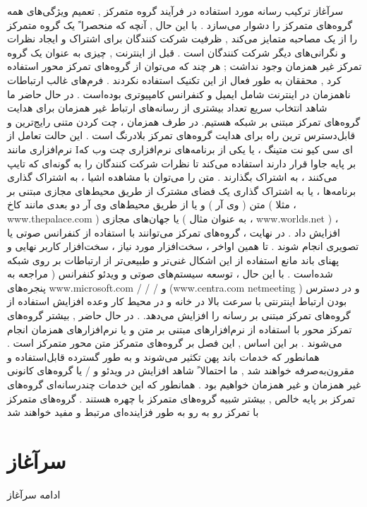 \documentclass{beamer}
\begin{document}
\begin{persian}
\begin{frame}{سرآغاز}
ترکیب رسانه مورد استفاده در فرآیند گروه متمرکز , تعمیم ویژگی‌های همه گروه‌های متمرکز را دشوار می‌سازد . با این حال , آنچه که منحصرا ً یک گروه متمرکز را از یک مصاحبه متمایز می‌کند , ظرفیت شرکت کنندگان برای اشتراک و ایجاد نظرات و نگرانی‌های دیگر شرکت کنندگان است . قبل از اینترنت , چیزی به عنوان یک گروه تمرکز غیر همزمان وجود نداشت ; هر چند که می‌توان از گروه‌های تمرکز محور استفاده کرد , محققان به طور فعال از این تکنیک استفاده نکردند . فرم‌های غالب ارتباطات ناهمزمان در اینترنت شامل ایمیل و کنفرانس کامپیوتری بوده‌است . در حال حاضر ما شاهد انتخاب سریع تعداد بیشتری از رسانه‌های ارتباط غیر همزمان برای هدایت گروه‌های تمرکز مبتنی بر شبکه هستیم. در طرف همزمان ، چت کردن متنی رایج‌ترین و قابل‌دسترس ترین راه برای هدایت گروه‌های تمرکز بلادرنگ است . این حالت تعامل از نرم‌افزاری مانند Iای سی کیو نت متینگ ، یا یکی از برنامه‌های نرم‌افزاری چت وب که بر پایه جاوا قرار دارند استفاده می‌کند تا نظرات شرکت کنندگان را به گونه‌ای که تایپ می‌کنند ، به اشتراک بگذارند . متن را می‌توان با مشاهده اشیا ، به اشتراک گذاری برنامه‌ها ، یا به اشتراک گذاری یک فضای مشترک از طریق محیط‌های مجازی مبتنی بر متن ( وی آر ) و یا از طریق محیط‌های وی آر دو بعدی مانند کاخ ( مثلا ، www.thepalace.com ) یا جهان‌های مجازی ( به عنوان مثال ، www.worlds.net ) ، افزایش داد . در نهایت ، گروه‌های تمرکز می‌توانند با استفاده از کنفرانس صوتی یا تصویری انجام شوند . تا همین اواخر ، سخت‌افزار مورد نیاز ، سخت‌افزار کاربر نهایی و پهنای باند مانع استفاده از این اشکال غنی‌تر و طبیعی‌تر از ارتباطات بر روی شبکه شده‌است . با این حال ، توسعه سیستم‌های صوتی و ویدئو کنفرانس ( مراجعه به پنجره‌های www.microsoft.com / / / و (www.centra.com netmeeting ) و در دسترس بودن ارتباط اینترنتی با سرعت بالا در خانه و در محیط کار وعده افزایش استفاده از گروه‌های تمرکز مبتنی بر رسانه را افزایش می‌دهد. . 
در حال حاضر , بیشتر گروه‌های تمرکز محور با استفاده از نرم‌افزارهای مبتنی بر متن و یا نرم‌افزارهای همزمان انجام می‌شوند . بر این اساس , این فصل بر گروه‌های متمرکز متن محور متمرکز است . همانطور که خدمات باند پهن تکثیر می‌شوند و به طور گسترده قابل‌استفاده و مقرون‌به‌صرفه خواهند شد , ما احتمالا ً شاهد افزایش در ویدئو و / یا گروه‌های کانونی غیر همزمان و غیر همزمان خواهیم بود . همانطور که این خدمات چندرسانه‌ای گروه‌های تمرکز بر پایه خالص , بیشتر شبیه گروه‌های متمرکز با چهره هستند . گروه‌های متمرکز با تمرکز رو به رو به طور فزاینده‌ای مرتبط و مفید خواهند شد 

\end{frame}


\section{سرآغاز}
\begin{frame}{ادامه سرآغاز}


\end{frame}
\end{persian}
\end{document}
